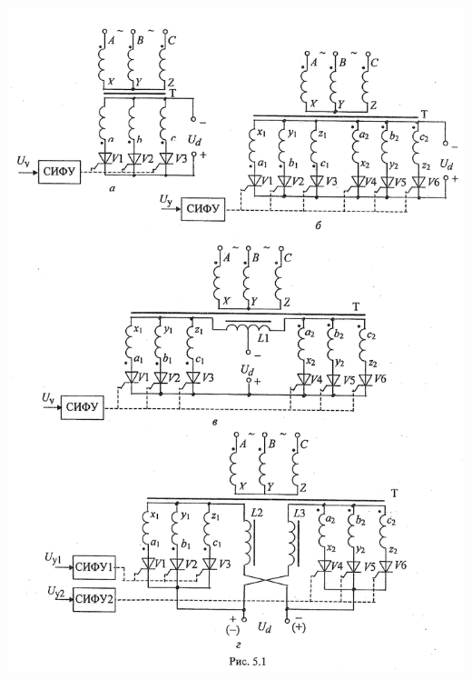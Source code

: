 \documentclass[a4paper,14pt]{article}
\begin{document}
\includegraphics[scale=0.7]{ris51a}
\end{document}
